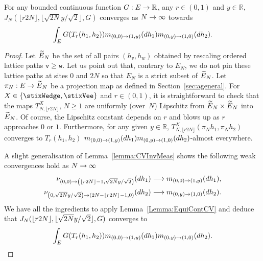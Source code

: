 \documentclass[AHL,Unicode,longabstracts]{cedram}
\newcommand{\Wedge}{\stixWedge}
\newcommand{\Vee}{\stixVee}
\theoremstyle{plain}
\newcommand{\tv}{\mathtt{v}}
\newcommand{\Tw}{\mathtt{w}}
\newcommand{\R}{\mathbb{R}}
\let\oldtilde\tilde
\renewcommand*{\tilde}[1]{\mathchoice{\widetilde{#1}}{\widetilde{#1}}{\oldtilde{#1}}{\oldtilde{#1}}}
\let\originalleft\left
\let\originalright\right
\renewcommand{\left}{\mathopen{}\mathclose\bgroup\originalleft}
\renewcommand{\right}{\aftergroup\egroup\originalright}
\renewcommand*{\to}{\mathchoice{\longrightarrow}{\rightarrow}{\rightarrow}{\rightarrow}}
\begin{document}
\begin{lemm}\label{lemma:CVJ}
For any bounded continuous function $G:E\to\R$, any $r\in (0,1)$ and $y\in\R$, $J_N(\lfloor r2N\rfloor, \lfloor\sqrt{2N} y/\sqrt{2}\rfloor,G)$ converges as $N\to\infty$ towards
\[
\int_E G(T_r(h_1,h_2)) m_{(0,0)\to (1,y)}(dh_1) m_{(0,y)\to (1,0)}(dh_2).
\]
\end{lemm}
\begin{proof}
Let $\tilde{E}_N$ be the set of all pairs $(h_v,h_w)$ obtained by rescaling ordered lattice paths $\tv \ge \Tw$. Let us point out that, contrary to $E_N$, we do not pin these lattice paths at sites $0$ and $2N$ so that $E_N$ is a strict subset of $\tilde{E}_N$. Let $\pi_N:E\to \tilde{E}_N$ be a projection map as defined in Section~\ref{sec:ageneral}. For $X\in \{\Wedge,\Vee\}$ and $r\in (0,1)$, it is straightforward to check that the maps $T_{N,\lfloor r2N \rfloor}^X$, $N\ge 1$ are uniformly (over~$N$) Lipschitz from $\tilde{E}_N\times \tilde{E}_N$ into $\tilde{E}_N$. Of course, the Lipschitz constant depends on $r$ and blows up as $r$ approaches $0$ or $1$. Furthermore, for any given $y\in\R$, $T_{N,\lfloor r2N \rfloor}^X(\pi_N h_1,\pi_N h_2)$ converges to $T_r(h_1,h_2)$ $m_{(0,0)\to (1,y)}(dh_1) m_{(0,y)\to (1,0)}(dh_2)$-almost everywhere.

A slight generalisation of Lemma~\ref{lemma:CVInvMeas} shows the following weak convergences hold as $N\to\infty$
\begin{align*}
\nu_{(0,0)\to \left(\lfloor r2N\rfloor-1,\sqrt{2N} y/\sqrt{2}\right)}(dh_1) \to m_{(0,0)\to (1,y)}(dh_1) ,\\
\nu_{\left(0,\sqrt{2N} y/\sqrt{2}\right)\to \left(2N-\lfloor r2N\rfloor-1,0\right)}(dh_2) \to m_{(0,y)\to (1,0)}(dh_2).
\end{align*}
We have all the ingredients to apply Lemma~\ref{Lemma:EquiContCV} and deduce that $J_N(\lfloor r2N\rfloor,\linebreak \lfloor\sqrt{2N} y/\sqrt{2}\rfloor,G)$ converges to
\[
\int_E G(T_r(h_1,h_2)) m_{(0,0)\to (1,y)}(dh_1) m_{(0,y)\to (1,0)}(dh_2).
\]
\end{proof}
\end{document}
